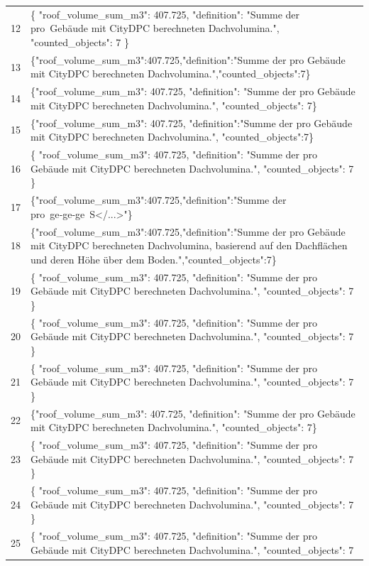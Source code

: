\documentclass[a4paper,11pt]{article}
\begin{document}
\begin{table}[ht]
\begin{tabular}{r p{12cm}}
12 & \{
  "roof\_volume\_sum\_m3": 407.725,
  "definition": "Summe der pro Gebäude mit CityDPC berechnet­en Dachvolumina.",
  "counted\_objects": 7
\} \\
13 & \{"roof\_volume\_sum\_m3":407.725,"definition":"Summe der pro Gebäude mit CityDPC berechneten Dachvolumina.","counted\_objects":7\} \\
14 & \{"roof\_volume\_sum\_m3": 407.725, "definition": "Summe der pro Gebäude mit CityDPC berechneten Dachvolumina.", "counted\_objects": 7\} \\
15 & \{"roof\_volume\_sum\_m3": 407.725, "definition":"Summe der pro Gebäude mit CityDPC berechneten Dachvolumina.", "counted\_objects":7\} \\
16 & \{
  "roof\_volume\_sum\_m3": 407.725,
  "definition": "Summe der pro Gebäude mit CityDPC berechneten Dachvolumina.",
  "counted\_objects": 7
\} \\
17 & \{"roof\_volume\_sum\_m3":407.725,"definition":"Summe der pro ge‑ge‑ge S</...>"\} \\
18 & \{"roof\_volume\_sum\_m3":407.725,"definition":"Summe der pro Gebäude mit CityDPC berechneten Dachvolumina, basierend auf den Dachflächen und deren Höhe über dem Boden.","counted\_objects":7\} \\
19 & \{
  "roof\_volume\_sum\_m3": 407.725,
  "definition": "Summe der pro Gebäude mit CityDPC berechneten Dachvolumina.",
  "counted\_objects": 7
\} \\
20 & \{
  "roof\_volume\_sum\_m3": 407.725,
  "definition": "Summe der pro Gebäude mit CityDPC berechneten Dachvolumina.",
  "counted\_objects": 7
\} \\
21 & \{
  "roof\_volume\_sum\_m3": 407.725,
  "definition": "Summe der pro Gebäude mit CityDPC berechneten Dachvolumina.",
  "counted\_objects": 7
\} \\
22 & \{"roof\_volume\_sum\_m3": 407.725, "definition": "Summe der pro Gebäude mit CityDPC berechneten Dachvolumina.", "counted\_objects": 7\} \\
23 & \{
  "roof\_volume\_sum\_m3": 407.725,
  "definition": "Summe der pro Gebäude mit CityDPC berechneten Dachvolumina.",
  "counted\_objects": 7
\} \\
24 & \{
  "roof\_volume\_sum\_m3": 407.725,
  "definition": "Summe der pro Gebäude mit CityDPC berechneten Dachvolumina.",
  "counted\_objects": 7
\} \\
25 & \{
  "roof\_volume\_sum\_m3": 407.725,
  "definition": "Summe der pro Gebäude mit CityDPC berechneten Dachvolumina.",
  "counted\_objects": 7

\end{tabular}
\end{table}
\end{document}
